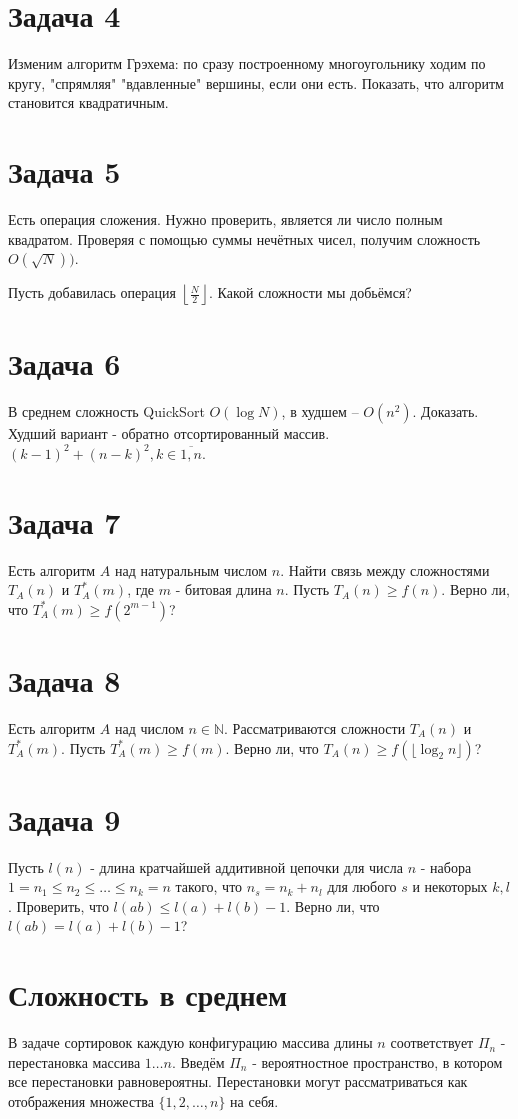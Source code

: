 \documentclass[11pt]{article}
\newcounter{th}\setcounter{th}{0}
\begin{document}
\section{Задача 4}
\label{sec:orgbe6f2bd}
Изменим алгоритм Грэхема: по сразу построенному многоугольнику ходим по кругу, "спрямляя"
"вдавленные" вершины, если они есть. Показать, что алгоритм становится квадратичным.
\section{Задача 5}
\label{sec:org892a0c1}
Есть операция сложения. Нужно проверить, является ли число полным квадратом. Проверяя с
помощью суммы нечётных чисел, получим сложность \(O(\sqrt{N}))\).

Пусть добавилась операция \(\left\lfloor\frac{N}2\right\rfloor\). Какой сложности мы добьёмся?
\section{Задача 6}
\label{sec:org456375b}
В среднем сложность QuickSort \(O(\log N)\), в худшем -- \(O(n^2)\). Доказать.
Худший вариант - обратно отсортированный массив. \((k - 1)^2 + (n - k)^2, k \in \overline{1, n}\).
\section{Задача 7}
\label{sec:org78ddb10}
Есть алгоритм \(A\) над натуральным числом \(n\). Найти связь между сложностями \(T_A(n)\) и \(T_A^*(m)\),
где \(m\) - битовая длина \(n\). Пусть \(T_A(n) \geq f(n)\). Верно ли, что \(T_A^*(m) \geq f(2^{m - 1})\)?
\section{Задача 8}
\label{sec:org41087fa}
Есть алгоритм \(A\) над числом \(n \in \mathbb{N}\). Рассматриваются сложности \(T_A(n)\) и \(T_A^*(m)\).
Пусть \(T_A^*(m) \geq f(m)\). Верно ли, что \(T_A(n) \geq f(\lfloor\log_2n\rfloor)\)?
\section{Задача 9}
\label{sec:org61acb39}
Пусть \(l(n)\) - длина кратчайшей аддитивной цепочки для числа \(n\) - набора
\(1 = n_1 \leq n_2 \leq \ldots \leq n_k = n\)
такого, что \(n_s = n_k + n_l\) для любого \(s\) и некоторых \(k, l\).
Проверить, что \(l(ab) \leq l(a) + l(b) - 1\). Верно ли, что \(l(ab) = l(a) + l(b) - 1\)?
\section{Сложность в среднем}
\label{sec:org6092c97}
В задаче сортировок каждую конфигурацию массива длины \(n\) соответствует \(\Pi_n\) - перестановка массива \(1\ldots n\).
Введём \(\Pi_n\) - вероятностное пространство, в котором все перестановки равновероятны.
Перестановки могут рассматриваться как отображения множества \(\{1, 2, \ldots, n\}\) на себя.
\end{document}
